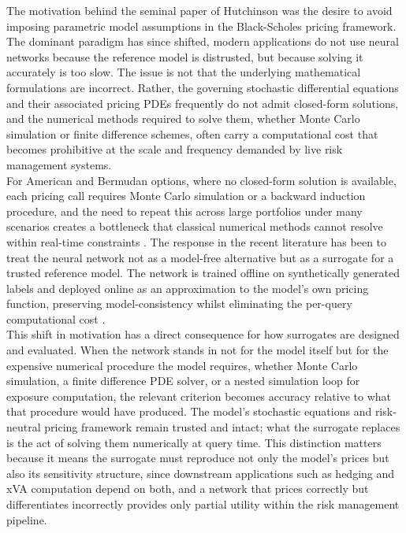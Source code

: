     \noindent
    The motivation behind the seminal paper of Hutchinson \cite{hutchinson1994nonparametric} was the desire to avoid imposing parametric model assumptions in the Black-Scholes pricing framework. The dominant paradigm has since shifted, modern applications do not use neural networks because the reference model is distrusted, but because solving it accurately is
    too slow. The issue is not that the underlying mathematical formulations are incorrect. Rather, the governing stochastic differential equations and their associated pricing PDEs frequently do not admit closed-form solutions, and the numerical methods required to solve them, whether Monte Carlo simulation or finite difference schemes, often carry a computational cost that becomes prohibitive at the scale and frequency demanded by live risk management systems. \\

    \noindent
    For American and Bermudan options, where no closed-form solution is available, each pricing call requires Monte Carlo simulation or a backward induction procedure, and the need to repeat this across large portfolios under many scenarios creates a bottleneck that classical numerical methods cannot resolve within real-time constraints \cite{hutzenthaler2020overcoming, anderson2023accelerated}. The response in the recent literature has been to treat the neural network not as a model-free alternative but as a surrogate for a trusted reference model. The network is trained offline on synthetically generated labels and deployed online as an approximation to the model's own pricing function, preserving model-consistency whilst eliminating the per-query computational cost \cite{despiegeleer2018machine, becker2023learning}. \\

    \noindent
    This shift in motivation has a direct consequence for how surrogates are designed and evaluated. When the network stands in not for the model itself but for the expensive numerical procedure the model requires, whether Monte Carlo simulation, a finite difference PDE solver, or a nested simulation loop for exposure computation, the relevant criterion becomes accuracy relative to what that procedure would have produced. The model's stochastic equations and risk-neutral pricing framework remain trusted and intact; what the surrogate replaces is the act
    of solving them numerically at query time. This distinction matters because it means the surrogate must reproduce not only the model's prices but also its sensitivity structure, since downstream applications such as hedging and xVA computation depend on both, and a network that prices correctly but differentiates incorrectly provides only partial utility within the risk
    management pipeline. \\

